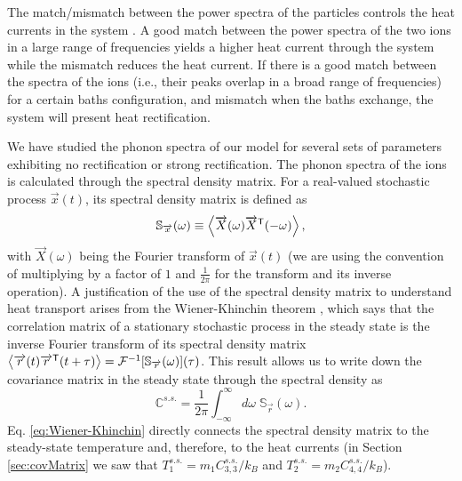 The match/mismatch between the power spectra of the particles controls the heat currents in the system \cite{Terraneo2002,Li2004}. A good match between the power spectra of the two ions in a large range of frequencies yields a higher heat current through the system while the mismatch  reduces the heat current.
If there is a good match between the spectra of the ions (i.e., their peaks overlap in a broad range of frequencies) for a certain baths configuration, and mismatch when the baths exchange, the system will present heat rectification.

We have studied the phonon spectra of our model for several sets of parameters exhibiting no rectification or strong rectification. The phonon spectra of the ions is calculated through the spectral density matrix. For a real-valued stochastic process $\overrightarrow{x}(t)$, its spectral density matrix is defined as \cite{Sarkka2019}
%
\begin{equation}
  \mathbb{S}_{\overrightarrow{x}}(\omega) \equiv \expval{ \overrightarrow{X}(\omega) \overrightarrow{X}^\mathsf{T}(-\omega) },
  \label{eq:SpectralDensityDefinition}
\end{equation}
%
with $\overrightarrow{X}(\omega)$ being the Fourier transform of $\overrightarrow{x}(t)$ (we are using the convention of multiplying by a factor of $1$ and $\frac{1}{2\pi}$ for the transform and its inverse operation). A justification of the use of the spectral density matrix to understand heat transport arises from the Wiener-Khinchin theorem \cite{Sarkka2019}, which says that the correlation matrix of a stationary stochastic process in the steady state is the inverse Fourier transform of its spectral density matrix $\expval{\overrightarrow{r}(t)\overrightarrow{r}^\mathsf{T}(t+\tau)} = \mathcal{F}^{-1}[\mathbb{S}_{\overrightarrow{r}}(\omega)](\tau)$. This result allows us to write down the covariance matrix in the steady state through the spectral density as
%
\begin{equation}
  \mathbb{C}^{s.s.} = \frac{1}{2\pi} \int_{-\infty}^{\infty}d\omega\;\mathbb{S}_{\overrightarrow{r}}(\omega).
  \label{eq:Wiener-Khinchin}
\end{equation}
%
Eq. \eqref{eq:Wiener-Khinchin} directly connects the spectral density matrix to the steady-state temperature and, therefore, to the heat currents (in Section \ref{sec:covMatrix} we saw that  $T_1^{s.s.} = {m_1 C_{3,3}^{s.s.}}/{k_B}$ and $T_2^{s.s.} = {m_2 C_{4,4}^{s.s.}}/{k_B}$).


